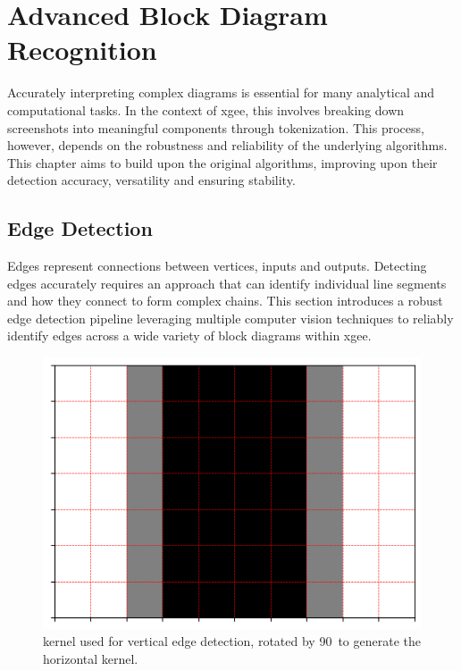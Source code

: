 \chapter{Advanced Block Diagram Recognition}
\label{chap:new_concepts}
Accurately interpreting complex diagrams is essential for many analytical and computational tasks. In the context of \acrshort{xgee}, this involves breaking down screenshots into meaningful components through tokenization. This process, however, depends on the robustness and reliability of the underlying algorithms. This chapter aims to build upon the original algorithms, improving upon their detection accuracy, versatility and ensuring stability.

\section{Edge Detection}
\label{sec:edge_detection}
Edges represent connections between vertices, inputs and outputs. Detecting edges accurately requires an approach that can identify individual line segments and how they connect to form complex chains. This section introduces a robust edge detection pipeline leveraging multiple computer vision techniques to reliably identify edges across a wide variety of block diagrams within \acrshort{xgee}.
\begin{figure}
    \centering
    \includegraphics[width=\linewidth]{pictures/kernel_ver.png}
    \caption[Kernel used for vertical edge detection]{kernel used for vertical edge detection, rotated by 90\textdegree\ to generate the horizontal kernel.}
    \label{fig:kernel_ver}
\end{figure}

